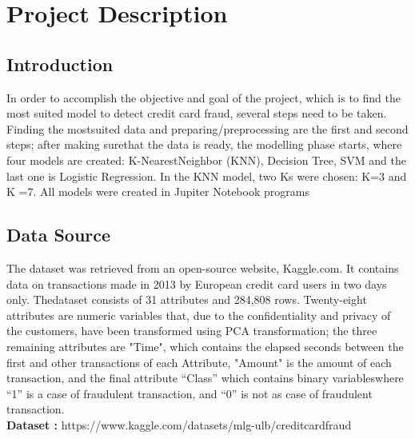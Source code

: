 \chapter{ Project Description}
\section{Introduction}
In order to accomplish the objective and goal of the project, which is to find the most suited model to detect credit card fraud, several steps need to be taken. Finding the mostsuited data and preparing/preprocessing are the first and second steps; after making surethat the data is ready, the modelling phase starts, where four models are created: K-NearestNeighbor (KNN), Decision Tree, 
SVM and the last one is Logistic Regression. In the KNN model, two Ks were chosen: K=3 and K =7. All models were created in Jupiter Notebook programs


\section{Data Source}

The dataset was retrieved from an open-source website, Kaggle.com. It contains data on transactions made in 2013 by European credit card users in two days only. Thedataset consists of 31 attributes and 284,808 rows. Twenty-eight attributes are numeric variables that, due to the confidentiality and privacy of the customers, have been transformed using PCA transformation; the three remaining attributes are "Time", which contains the elapsed seconds between the first and other transactions of each Attribute, "Amount" is the amount of each transaction, and the final attribute “Class” which contains binary variableswhere “1” is a case of fraudulent transaction, and “0” is not as case of fraudulent transaction.\\
\textbf{Dataset : }{https://www.kaggle.com/datasets/mlg-ulb/creditcardfraud}





